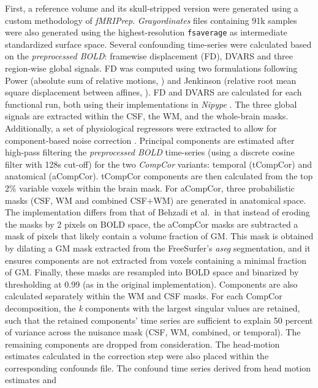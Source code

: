 \documentclass[]{article}
\begin{document}
\begin{description}
First, a reference volume and its skull-stripped version were generated
using a custom methodology of \emph{fMRIPrep}. \emph{Grayordinates}
files \citep{hcppipelines} containing 91k samples were also generated
using the highest-resolution \texttt{fsaverage} as intermediate
standardized surface space. Several confounding time-series were
calculated based on the \emph{preprocessed BOLD}: framewise displacement
(FD), DVARS and three region-wise global signals. FD was computed using
two formulations following Power (absolute sum of relative motions,
\citet{power_fd_dvars}) and Jenkinson (relative root mean square
displacement between affines, \citet{mcflirt}). FD and DVARS are
calculated for each functional run, both using their implementations in
\emph{Nipype} \citep[following the definitions by][]{power_fd_dvars}.
The three global signals are extracted within the CSF, the WM, and the
whole-brain masks. Additionally, a set of physiological regressors were
extracted to allow for component-based noise correction
\citep[\emph{CompCor},][]{compcor}. Principal components are estimated
after high-pass filtering the \emph{preprocessed BOLD} time-series
(using a discrete cosine filter with 128s cut-off) for the two
\emph{CompCor} variants: temporal (tCompCor) and anatomical (aCompCor).
tCompCor components are then calculated from the top 2\% variable voxels
within the brain mask. For aCompCor, three probabilistic masks (CSF, WM
and combined CSF+WM) are generated in anatomical space. The
implementation differs from that of Behzadi et al.~in that instead of
eroding the masks by 2 pixels on BOLD space, the aCompCor masks are
subtracted a mask of pixels that likely contain a volume fraction of GM.
This mask is obtained by dilating a GM mask extracted from the
FreeSurfer's \emph{aseg} segmentation, and it ensures components are not
extracted from voxels containing a minimal fraction of GM. Finally,
these masks are resampled into BOLD space and binarized by thresholding
at 0.99 (as in the original implementation). Components are also
calculated separately within the WM and CSF masks. For each CompCor
decomposition, the \emph{k} components with the largest singular values
are retained, such that the retained components' time series are
sufficient to explain 50 percent of variance across the nuisance mask
(CSF, WM, combined, or temporal). The remaining components are dropped
from consideration. The head-motion estimates calculated in the
correction step were also placed within the corresponding confounds
file. The confound time series derived from head motion estimates and

\end{description}
\end{document}
